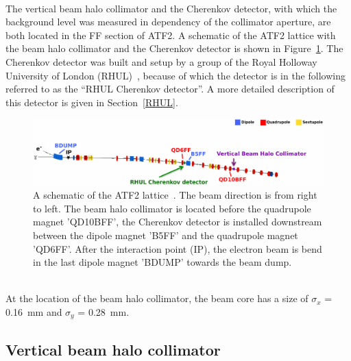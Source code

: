 \\The vertical beam halo collimator and the Cherenkov detector, with which the background level was measured in dependency of the collimator aperture, are both located in the FF section of ATF2. 
A schematic of the ATF2 lattice with the beam halo collimator and the Cherenkov detector is shown in Figure~\ref{fig:ATF2}. 
The Cherenkov detector was built and setup by a group of the Royal Holloway University of London (RHUL)~\cite{RHUL_detector_wiki}, because of which the detector is in the following referred to as the ``RHUL Cherenkov detector''.
A more detailed description of this detector is given in Section~\ref{RHUL}.
\begin{figure}
\centering
\includegraphics[width=\textwidth]{Figures/ATF/ATF2schematic.pdf}
\caption[ATF2 schematic]{A schematic of the ATF2 lattice~\cite{Nuria}. 
The beam direction is from right to left. 
The beam halo collimator is located before the quadrupole magnet 'QD10BFF', the Cherenkov detector is installed downstream between the dipole magnet 'B5FF' and the quadrupole magnet 'QD6FF'. 
After the interaction point (IP), the electron beam is bend in the last dipole magnet 'BDUMP' towards the beam dump. 
}
\label{fig:ATF2}
\end{figure}
\\At the location of the beam halo collimator, the beam core has a size of $\sigma_x$ = \SI{0.16}{\milli\meter} and $\sigma_y$ = \SI{0.28}{\milli\meter}.

\subsection{Vertical beam halo collimator}
\label{Collimator}

